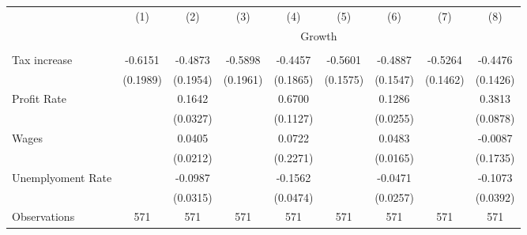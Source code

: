 \begin{tabular}{lcccccccc} \\ \hline 
                    &\multicolumn{1}{c}{(1)}         &\multicolumn{1}{c}{(2)}         &\multicolumn{1}{c}{(3)}         &\multicolumn{1}{c}{(4)}         &\multicolumn{1}{c}{(5)}         &\multicolumn{1}{c}{(6)}         &\multicolumn{1}{c}{(7)}         &\multicolumn{1}{c}{(8)}         \\
& \multicolumn{8}{c}{Growth} \\ \hline &  &  &  &  &  &  &  &  &  \\
Tax increase        &     -0.6151\sym{***}&     -0.4873\sym{**} &     -0.5898\sym{***}&     -0.4457\sym{**} &     -0.5601\sym{***}&     -0.4887\sym{***}&     -0.5264\sym{***}&     -0.4476\sym{***}\\
                    &    (0.1989)         &    (0.1954)         &    (0.1961)         &    (0.1865)         &    (0.1575)         &    (0.1547)         &    (0.1462)         &    (0.1426)         \\
\addlinespace
Profit Rate         &                     &      0.1642\sym{***}&                     &      0.6700\sym{***}&                     &      0.1286\sym{***}&                     &      0.3813\sym{***}\\
                    &                     &    (0.0327)         &                     &    (0.1127)         &                     &    (0.0255)         &                     &    (0.0878)         \\
\addlinespace
Wages               &                     &      0.0405\sym{*}  &                     &      0.0722         &                     &      0.0483\sym{***}&                     &     -0.0087         \\
                    &                     &    (0.0212)         &                     &    (0.2271)         &                     &    (0.0165)         &                     &    (0.1735)         \\
\addlinespace
Unemplyoment Rate   &                     &     -0.0987\sym{***}&                     &     -0.1562\sym{***}&                     &     -0.0471\sym{*}  &                     &     -0.1073\sym{***}\\
                    &                     &    (0.0315)         &                     &    (0.0474)         &                     &    (0.0257)         &                     &    (0.0392)         \\
\arrayrulecolor{black!10}\midrule
Observations        &         571         &         571         &         571         &         571         &         571         &         571         &         571         &         571         \\

\end{tabular}
